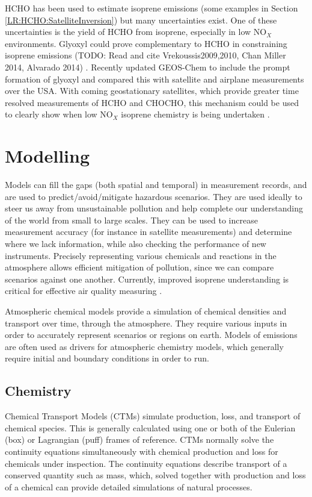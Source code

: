     HCHO has been used to estimate isoprene emissions (some examples in Section \ref{LR:HCHO:SatelliteInversion}) but many uncertainties exist.
    One of these uncertainties is the yield of HCHO from isoprene, especially in low NO$_X$ environments.
    Glyoxyl could prove complementary to HCHO in constraining isoprene emissions (TODO: Read and cite Vrekoussis2009,2010, Chan Miller 2014, Alvarado 2014) \citep{Miller2017}.
    Recently \cite{Miller2017} updated GEOS-Chem to include the prompt formation of glyoxyl and compared this with satellite and airplane measurements over the USA.
    With coming geostationary satellites, which provide greater time resolved measurements of HCHO and CHOCHO, this mechanism could be used to clearly show when low NO$_X$ isoprene chemistry is being undertaken \citep{Miller2017}.
  
\section{Modelling}
\label{LR:Models}
  
  Models can fill the gaps (both spatial and temporal) in measurement records, and are used to predict/avoid/mitigate hazardous scenarios.
  They are used ideally to steer us away from unsustainable pollution and help complete our understanding of the world from small to large scales.
  They can be used to increase measurement accuracy (for instance in satellite measurements) and determine where we lack information, while also checking the performance of new instruments.
  Precisely representing various chemicals and reactions in the atmosphere allows efficient mitigation of pollution, since we can compare scenarios against one another.
  Currently, improved isoprene understanding is critical for effective air quality measuring \citep{Marvin2017}.
  
  Atmospheric chemical models provide a simulation of chemical densities and transport over time, through the atmosphere.
  They require various inputs in order to accurately represent scenarios or regions on earth.
  Models of emissions are often used as drivers for atmospheric chemistry models, which generally require initial and boundary conditions in order to run.
  
  \subsection{Chemistry}
  \label{LR:Models:chem}
  Chemical Transport Models (CTMs) simulate production, loss, and transport of chemical species.
  This is generally calculated using one or both of the Eulerian (box) or Lagrangian (puff) frames of reference.
  CTMs normally solve the continuity equations simultaneously with chemical production and loss for chemicals under inspection. 
  The continuity equations describe transport of a conserved quantity such as mass, which, solved together with production and loss of a chemical can provide detailed simulations of natural processes.
  
